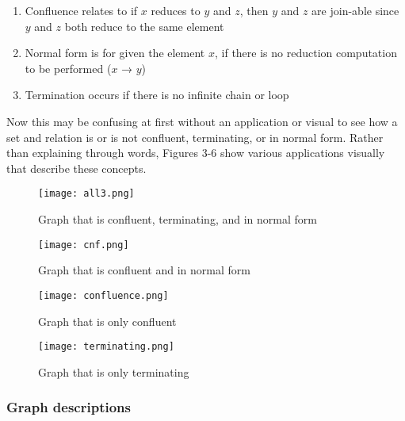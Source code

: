 \documentclass{article}
\begin{document}
\begin{enumerate}
    \item Confluence relates to if $x$ reduces to $y$ and $z$, then $y$ and $z$ are join-able since $y$ and $z$ both reduce to the same element
    \item Normal form is for given the element $x$, if there is no reduction computation to be performed ($x$ → $y$)
    \item Termination occurs if there is no infinite chain or loop
\end{enumerate}

\noindent
Now this may be confusing at first without an application or visual to see how a set and relation is or is not confluent, terminating, or in normal form. Rather than explaining through words, Figures 3-6 show various applications visually that describe these concepts.

\begin{figure}[H]
    \centering
    \texttt{[image: all3.png]}
    \caption{Graph that is confluent, terminating, and in normal form}
    \label{fig:AST1}
\end{figure}

\begin{figure}[H]
    \centering
    \texttt{[image: cnf.png]}
    \caption{Graph that is confluent and in normal form}
    \label{fig:AST2}
\end{figure}

\begin{figure}[H]
    \centering
    \texttt{[image: confluence.png]}
    \caption{Graph that is only confluent}
    \label{fig:AST3}
\end{figure}

\begin{figure}[H]
    \centering
    \texttt{[image: terminating.png]}
    \caption{Graph that is only terminating}
    \label{fig:AST4}
\end{figure}

\subsubsection{Graph descriptions}
\end{document}
